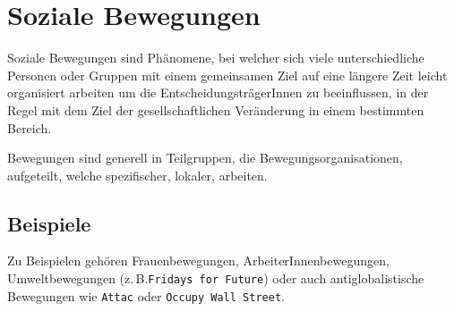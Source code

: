 \documentclass{article}
\begin{document}
\section{Soziale Bewegungen}
Soziale Bewegungen sind Phänomene, bei welcher sich viele unterschiedliche Personen oder Gruppen mit einem gemeinsamen Ziel auf eine längere Zeit leicht organisiert arbeiten um die EntscheidungsträgerInnen zu beeinflussen, in der Regel mit dem Ziel der gesellschaftlichen Veränderung in einem bestimmten Bereich.
 
Bewegungen sind generell in Teilgruppen, die Bewegungsorganisationen, aufgeteilt, welche spezifischer, lokaler, arbeiten.
 
\subsection{Beispiele}
Zu Beispielen gehören Frauenbewegungen, ArbeiterInnenbewegungen, Umweltbewegungen (z.\,B.\texttt{Fridays for Future}) oder auch antiglobalistische Bewegungen wie \texttt{Attac} oder \texttt{Occupy Wall Street}.
 
\end{document}
